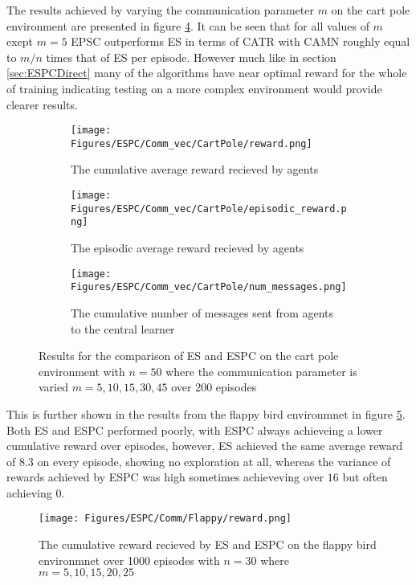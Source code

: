 The results achieved by varying the communication parameter $m$ on the cart pole environment are presented in figure \ref{fig:CPComm}. It can be seen that for all values of $m$ exept $m=5$ EPSC outperforms ES in terms of CATR with CAMN roughly equal to $m/n$ times that of ES per episode. However much like in section \ref{sec:ESPCDirect} many of the algorithms have near optimal reward for the whole of training indicating testing on a more complex environment would provide clearer results.
\begin{figure}
    \centering
    \begin{subfigure}{0.5\textwidth}
        \centering
        \texttt{[image: Figures/ESPC/Comm\_vec/CartPole/reward.png]}
        \caption{The cumulative average reward recieved by agents}
        \label{fig:CommReward}
    \end{subfigure}
    \begin{subfigure}{0.5\textwidth}
        \centering
        \texttt{[image: Figures/ESPC/Comm\_vec/CartPole/episodic\_reward.png]}
        \caption{The episodic average reward recieved by agents}
        \label{fig:CommEpisodicReward}
    \end{subfigure}
    \begin{subfigure}{0.5\textwidth}
        \centering
        \texttt{[image: Figures/ESPC/Comm\_vec/CartPole/num\_messages.png]}
        \caption{The cumulative number of messages sent from agents to the central learner}
        \label{fig:CommMessages}
    \end{subfigure}
    \caption{Results for the comparison of ES and ESPC on the cart pole environment with $n=50$ where the communication parameter is varied $m=5,10,15,30,45$ over 200 episodes}
    \label{fig:CPComm}
\end{figure}


This is further shown in the results from the flappy bird environmnet in figure \ref{fig:CommFlappyReward}. Both ES and ESPC performed poorly, with ESPC always achieveing a lower cumulative reward over episodes, however, ES achieved the same average reward of $8.3$ on every episode, showing no exploration at all, whereas the variance of rewards achieved by ESPC was high sometimes achieveving over $16$ but often achieving $0$.

\begin{figure}
    \centering
    \texttt{[image: Figures/ESPC/Comm/Flappy/reward.png]}
    \caption{The cumulative reward recieved by ES and ESPC on the flappy bird environmnet over 1000 episodes with $n=30$ where $m=5,10,15,20,25$}
    \label{fig:CommFlappyReward}
\end{figure}

